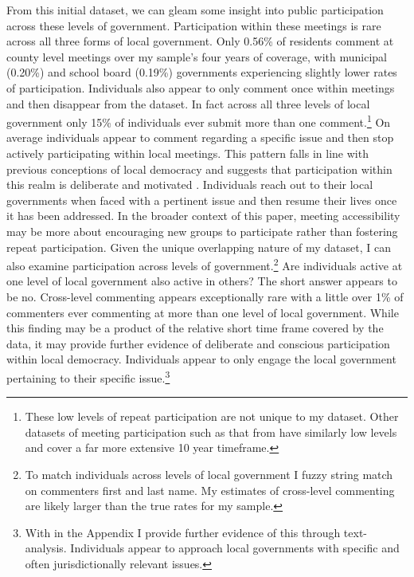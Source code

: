     
    From this initial dataset, we can gleam some insight into public participation across these levels of government. Participation within these meetings is rare across all three forms of local government.  Only 0.56\% of residents comment at county level meetings over my sample’s four years of coverage, with municipal (0.20\%) and school board (0.19\%) governments experiencing slightly lower rates of participation. Individuals also appear to only comment once within meetings and then disappear from the dataset. In fact across all three levels of local government only 15\% of individuals ever submit more than one comment.\footnote{These low levels of repeat participation are not unique to my dataset. Other datasets of meeting participation such as that from \citet{yoderDoesPropertyOwnership2020} have similarly low levels and cover a far more extensive 10 year timeframe.} On average individuals appear to comment regarding a specific issue and then stop actively participating within local meetings. This pattern falls in line with previous conceptions of local democracy and suggests that participation within this realm is deliberate and motivated \citep{oliverLocalElectionsPolitics2012,nuamahCloseHomePlaceBased2021}. Individuals reach out to their local governments when faced with a pertinent issue and then resume their lives once it has been addressed. In the broader context of this paper, meeting accessibility may be more about encouraging new groups to participate rather than fostering repeat participation. Given the unique overlapping nature of my dataset, I can also examine participation across levels of government.\footnote{To match individuals across levels of local government I fuzzy string match on commenters first and last name. My estimates of cross-level commenting are likely larger than the true rates for my sample.} Are individuals active at one level of local government also active in others? The short answer appears to be no. Cross-level commenting appears exceptionally rare with a little over 1\% of commenters ever commenting at more than one level of local government. While this finding may be a product of the relative short time frame covered by the data, it may provide further evidence of deliberate and conscious participation within local democracy.  Individuals appear to only engage the local government pertaining to their specific issue.\footnote{With in the Appendix I provide further evidence of this through text-analysis. Individuals appear to approach local governments with specific and often jurisdictionally relevant issues.}


